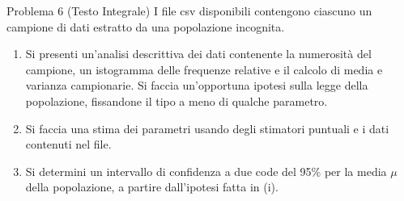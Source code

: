 \documentclass[11pt,a4paper]{article}
\begin{document}
\begin{problemabox}{Problema 6 (Testo Integrale)}
I file csv disponibili contengono ciascuno un campione di dati estratto da una popolazione incognita.
\begin{enumerate}[label=(\roman*)]
    \item Si presenti un'analisi descrittiva dei dati contenente la numerosità del campione, un istogramma delle frequenze relative e il calcolo di media e varianza campionarie. Si faccia un'opportuna ipotesi sulla legge della popolazione, fissandone il tipo a meno di qualche parametro.
    \item Si faccia una stima dei parametri usando degli stimatori puntuali e i dati contenuti nel file.
    \item Si determini un intervallo di confidenza a due code del 95\% per la media $\mu$ della popolazione, a partire dall'ipotesi fatta in (i).
\end{enumerate}
\end{problemabox}
\end{document}

